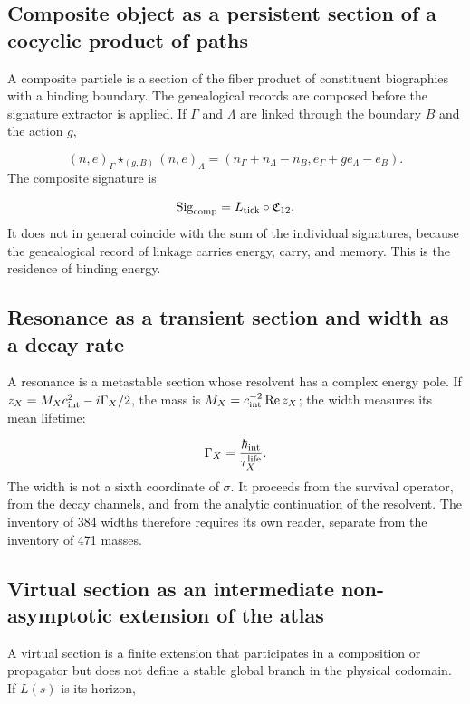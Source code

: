 
\subsection{Composite object as a persistent section of a cocyclic product of paths}
A composite particle is a section of the fiber product of constituent biographies with a binding boundary. The genealogical records are composed before the signature extractor is applied. If \(\Gamma\) and \(\Lambda\) are linked through the boundary \(B\) and the action \(g\),

\[
(n,e)_\Gamma\star_{(g,B)}(n,e)_\Lambda
=
(n_\Gamma+n_\Lambda-n_B,
e_\Gamma+ge_\Lambda-e_B).
\]
The composite signature is

\[
\operatorname{Sig}_{\rm comp}
=L_{\rm tick}\circ\mathfrak C_{12}.
\]
It does not in general coincide with the sum of the individual signatures, because the genealogical record of linkage carries energy, carry, and memory. This is the residence of binding energy.

\subsection{Resonance as a transient section and width as a decay rate}
A resonance is a metastable section whose resolvent has a complex energy pole. If \(z_X=M_Xc_{\rm int}^{2}-i\Gamma_X/2\), the mass is \(M_X=c_{\rm int}^{-2}\operatorname{Re}z_X\); the width measures its mean lifetime:

\[
\Gamma_X=\frac{\hbar_{\rm int}}{\tau_X^{\rm life}}.
\]
The width is not a sixth coordinate of \(\sigma\). It proceeds from the survival operator, from the decay channels, and from the analytic continuation of the resolvent. The inventory of 384 widths therefore requires its own reader, separate from the inventory of 471 masses.

\subsection{Virtual section as an intermediate non-asymptotic extension of the atlas}
A virtual section is a finite extension that participates in a composition or propagator but does not define a stable global branch in the physical codomain. If \(L(s)\) is its horizon,

